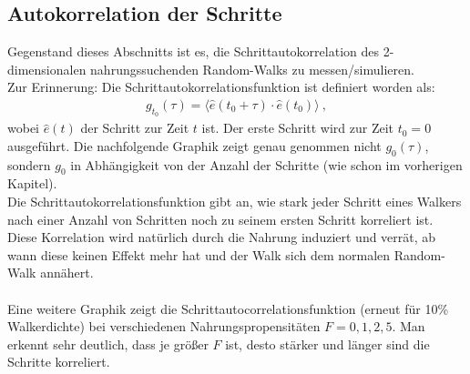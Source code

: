 \documentclass[a4paper, 12pt]{report}
\begin{document}
\subsection{Autokorrelation der Schritte}
Gegenstand dieses Abschnitts ist es, die Schrittautokorrelation des 2-dimensionalen nahrungssuchenden Random-Walks zu messen/simulieren. 
\\
Zur Erinnerung: Die Schrittautokorrelationsfunktion ist definiert worden als:
\begin{align}
g_{t_0}(\tau) = \langle \hat{e}(t_0+\tau) \cdot \hat{e}(t_0) \rangle\ ,
\end{align}
wobei $\hat{e}(t)$ der Schritt zur Zeit $t$ ist. Der erste Schritt wird zur Zeit $t_0 = 0$ ausgeführt. Die nachfolgende Graphik zeigt genau genommen nicht $g_0(\tau)$, sondern $g_0$ in Abhängigkeit von der Anzahl der Schritte (wie schon im vorherigen Kapitel).
\\
Die Schrittautokorrelationsfunktion gibt an, wie stark jeder Schritt eines Walkers nach einer Anzahl von Schritten noch zu seinem ersten Schritt korreliert ist. Diese Korrelation wird natürlich durch die Nahrung induziert und verrät, ab wann diese keinen Effekt mehr hat und der Walk sich dem normalen Random-Walk annähert.
\\
\\
Eine weitere Graphik zeigt die Schrittautocorrelationsfunktion (erneut für 10\% Walkerdichte) bei verschiedenen Nahrungspropensitäten $F=0,1,2,5$. Man erkennt sehr deutlich, dass je größer $F$ ist, desto stärker und länger sind die Schritte korreliert.
\end{document}
